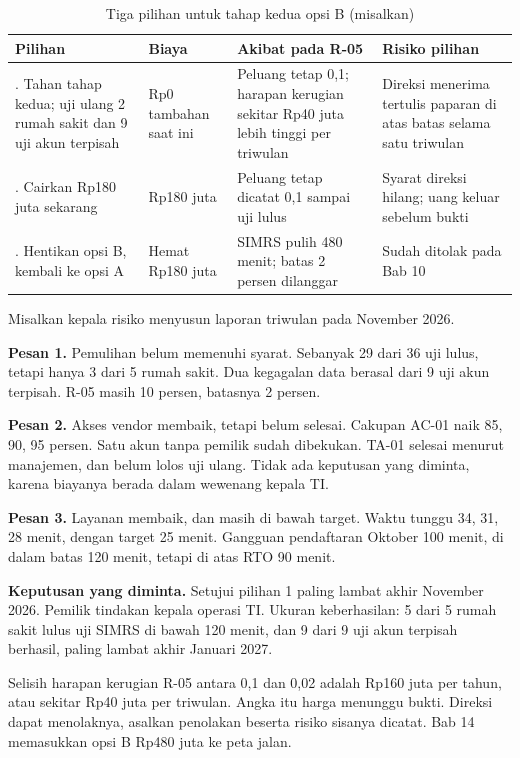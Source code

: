 \begin{table}[!htb]
  \centering\small
  \caption{Tiga pilihan untuk tahap kedua opsi B (misalkan)}\label{tab:ch13-keputusan}
  \begin{tabularx}{\textwidth}{|>{\raggedright\arraybackslash}p{}|>{\raggedright\arraybackslash}p{}|>{\raggedright\arraybackslash}X|>{\raggedright\arraybackslash}X|}
    \hline
    \textbf{Pilihan} & \textbf{Biaya} & \textbf{Akibat pada R-05} & \textbf{Risiko pilihan} \\
    \hline
    1. Tahan tahap kedua; uji ulang 2 rumah sakit dan 9 uji akun terpisah & Rp0 tambahan saat ini &
    Peluang tetap 0,1; harapan kerugian sekitar Rp40 juta lebih tinggi per triwulan & Direksi
    menerima tertulis paparan di atas batas selama satu triwulan \\ \hline
    2. Cairkan Rp180 juta sekarang & Rp180 juta & Peluang tetap dicatat 0,1 sampai uji lulus &
    Syarat direksi hilang; uang keluar sebelum bukti \\ \hline
    3. Hentikan opsi B, kembali ke opsi A & Hemat Rp180 juta & SIMRS pulih 480 menit; batas 2 persen
    dilanggar & Sudah ditolak pada Bab 10 \\ \hline
  \end{tabularx}
\end{table}

\begin{kasus}[title={Kasus Medikara Health: Laporan yang Meminta Satu Keputusan}]
Misalkan kepala risiko menyusun laporan triwulan pada November 2026.

\textbf{Pesan 1.} Pemulihan belum memenuhi syarat. Sebanyak 29 dari 36 uji lulus, tetapi hanya 3
dari 5 rumah sakit. Dua kegagalan data berasal dari 9 uji akun terpisah. R-05 masih 10 persen,
batasnya 2 persen.

\textbf{Pesan 2.} Akses vendor membaik, tetapi belum selesai. Cakupan AC-01 naik 85, 90, 95 persen.
Satu akun tanpa pemilik sudah dibekukan. TA-01 selesai menurut manajemen, dan belum lolos uji ulang.
Tidak ada keputusan yang diminta, karena biayanya berada dalam wewenang kepala TI.

\textbf{Pesan 3.} Layanan membaik, dan masih di bawah target. Waktu tunggu 34, 31, 28 menit, dengan
target 25 menit. Gangguan pendaftaran Oktober 100 menit, di dalam batas 120 menit, tetapi di atas
RTO 90 menit.

\textbf{Keputusan yang diminta.} Setujui pilihan 1 paling lambat akhir November 2026. Pemilik
tindakan kepala operasi TI. Ukuran keberhasilan: 5 dari 5 rumah sakit lulus uji SIMRS di bawah 120
menit, dan 9 dari 9 uji akun terpisah berhasil, paling lambat akhir Januari 2027.

Selisih harapan kerugian R-05 antara 0,1 dan 0,02 adalah Rp160 juta per tahun, atau sekitar Rp40
juta per triwulan. Angka itu harga menunggu bukti. Direksi dapat menolaknya, asalkan penolakan
beserta risiko sisanya dicatat. Bab 14 memasukkan opsi B Rp480 juta ke peta jalan.
\end{kasus}

